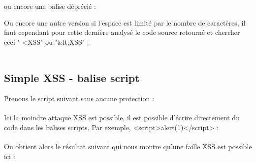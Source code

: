 \documentclass{article}
\begin{document}
ou encore une balise déprécié :
\vspace{0.2cm}\\
\vspace{0.2cm}

Ou encore une autre version si l'espace est limité par le nombre de caractères, il faut cependant pour cette dernière analysé le code source retourné et chercher ceci " <XSS" ou "\&lt;XSS" :
\vspace{0.2cm}\\
\vspace{0.2cm}\\

\subsection{Simple XSS - balise script}
Prenons le script suivant sans aucune protection :
\vspace{0.2cm}\\
\vspace{0.2cm}\\
Ici la moindre attaque XSS est possible, il est possible d'écrire directement du code dans les balises scripts. Par exemple, <script>alert(1)</script> :
\vspace{0.2cm}\\
\vspace{0.2cm}\\
On obtient alors le résultat suivant qui nous montre qu'une faille XSS est possible ici :
\vspace{0.2cm}\\
\end{document}
